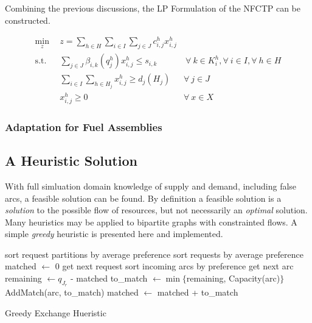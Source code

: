 Combining the previous discussions, the LP Formulation of the NFCTP can be constructed.

\begin{subequations}\label{eqs:GFCTP-LP}
  \begin{align}
    \min_{z} \:\: & 
    z = \sum_{h \in H}\sum_{i \in I}\sum_{j \in J}c_{i,j}^{h} x_{i,j}^{h} 
    & \label{eqs:GFCTP-LP_obj} \\
    \text{s.t.} \:\: &
    \sum_{j \in J}\beta_{i,k}(q_{j}^{h}) x_{i,j}^{h} \leq s_{i,k} 
    &
    \: \forall \: k \in K_{i}^{h},  
    \forall \: i \in I, \forall \: h \in H \label{eqs:GFCTP-LP_sup} \\
    &
    \sum_{i \in I}\sum_{h \in H_{j}} x_{i,j}^{h} \geq d_{j}(H_{j}) 
    & 
    \forall \: j \in J \label{eqs:GFCTP-LP_dem} \\
    &
    x^h_{i,j} \geq 0
    &
    \forall \: x \in X \label{eqs:GFCTP-LP_x}
  \end{align}
\end{subequations}

\subsubsection{Adaptation for Fuel Assemblies}



\subsection{A Heuristic Solution}

With full simluation domain knowledge of supply and demand, including false
arcs, a feasible solution can be found. By definition a feasible solution is a
\textit{solution} to the possible flow of resources, but not necessarily an
\textit{optimal} solution. Many heuristics may be applied to bipartite graphs
with constrainted flows. A simple \textit{greedy} heuristic is presented here
and implemented. 

\begin{algorithm}[h!]
 \SetAlgoLined
 sort request partitions by average preference\;
  {
   sort requests by average preference\;
   matched $\leftarrow$ 0\;        
    {
     get next request\;
     sort incoming arcs by preference\;
      {
       get next arc\;
       remaining $\leftarrow q_{J_r}$ - matched\;
       to\_match $\leftarrow \min \lbrace$remaining, Capacity(arc)$\rbrace$\;
       AddMatch(arc, to\_match)\;
       matched $\leftarrow$ matched + to\_match\;
     }
   }
 }
 \caption{Greedy Exchange Hueristic}\label{alg::greedy}
\end{algorithm}

